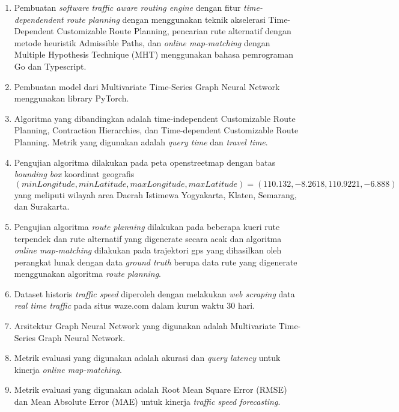 \begin{enumerate}
    \item Pembuatan \textit{software} \textit{traffic aware routing engine} dengan fitur \textit{time-dependendent route planning} dengan menggunakan teknik akselerasi Time-Dependent Customizable Route Planning, pencarian rute alternatif dengan metode heuristik Admissible Paths, dan \textit{online map-matching } dengan Multiple Hypothesis Technique (MHT) menggunakan bahasa pemrograman Go dan Typescript.
    \item Pembuatan model dari Multivariate Time-Series Graph Neural Network menggunakan library PyTorch.
    \item Algoritma yang dibandingkan adalah time-independent Customizable Route Planning, Contraction Hierarchies, dan Time-dependent Customizable Route Planning. Metrik yang digunakan adalah \textit{query time} dan \textit{travel time}.
    \item Pengujian algoritma dilakukan pada peta openstreetmap dengan batas \textit{bounding box} koordinat geografis $(minLongitude,minLatitude,maxLongitude,maxLatitude)=(110.132,-8.2618,110.9221,-6.888)$ yang meliputi wilayah area Daerah Istimewa Yogyakarta, Klaten, Semarang, dan Surakarta. 
    \item Pengujian algoritma \textit{route planning} dilakukan pada beberapa kueri rute terpendek dan rute alternatif yang digenerate secara acak dan algoritma \textit{online map-matching} dilakukan pada trajektori gps yang dihasilkan oleh perangkat lunak dengan data \textit{ground truth} berupa data rute yang digenerate menggunakan algoritma \textit{route planning}.
  
    \item Dataset historis \textit{traffic speed} diperoleh dengan melakukan \textit{web scraping} data \textit{real time traffic} pada situs waze.com dalam kurun waktu 30 hari.
    \item Arsitektur Graph Neural Network yang digunakan adalah Multivariate Time-Series Graph Neural Network.
    \item Metrik evaluasi yang digunakan adalah akurasi dan \textit{query latency} untuk kinerja \textit{online map-matching}.
    \item Metrik evaluasi yang digunakan adalah Root Mean Square Error (RMSE) dan Mean Absolute Error (MAE) untuk kinerja \textit{traffic speed forecasting}.
\end{enumerate}